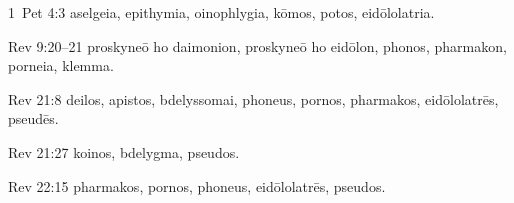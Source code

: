 1~Pet 4:3 \gls{aselgeia}, \gls{epithymia}, \gls{oinophlygia}, \gls{kōmos}, \gls{potos}, \gls{eidōlolatria}.

Rev 9:20--21 \gls{proskyneō ho daimonion}, \gls{proskyneō ho eidōlon}, %
\gls{phonos}, \gls{pharmakon}, \gls{porneia}, \gls{klemma}. %

Rev 21:8 \gls{deilos}, \gls{apistos}, \gls{bdelyssomai}, \gls{phoneus}, \gls{pornos}, \gls{pharmakos}, \gls{eidōlolatrēs}, \gls{pseudēs}.

Rev 21:27 \gls{koinos}, \gls{bdelygma}, \gls{pseudos}.

Rev 22:15 \gls{pharmakos}, \gls{pornos}, \gls{phoneus}, \gls{eidōlolatrēs}, \gls{pseudos}.


